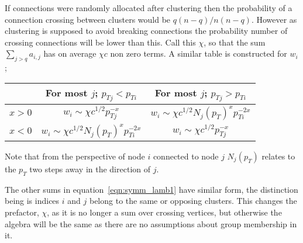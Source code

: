If connections were randomly allocated after clustering then the probability of a connection crossing between clusters would be \(q(n-q)/n(n-q)\).
However as clustering is supposed to avoid breaking connections the probability number of crossing connections will be lower than this.
Call this \(\chi\), so that the sum \(\sum_{j>q}a_{i,j}\) has on average \(\chi c\) non zero terms.
A similar table is constructed for \(w_{i}\);
\begin{center}
    \begin{tabular}{c | c c}
                & For most \(j\); \(p_{Tj} < p_{Ti}\) & For most \(j\); \(p_{Tj} > p_{Ti}\) \\
        \hline
        \(x>0\) & \(w_{i} \sim \chi c^{1/2}p_{Tj}^{-x}\) & \(w_{i} \sim \chi c^{1/2}N_j(p_T)^x p_{Ti}^{-2x}\)\\
        \(x<0\) & \(w_{i} \sim \chi c^{1/2}N_j(p_T)^x p_{Ti}^{-2x}\)& \(w_{i} \sim \chi c^{1/2}p_{Tj}^{-x}\)
    \end{tabular}
\end{center}

Note that from the perspective of node \(i\) connected to node \(j\)
\(N_j(p_T)\) relates to the \(p_T\) two steps away in the direction of \(j\).

The other sums in equation~\ref{eqn:symm_lamb1} have similar form,
the distinction being is indices \(i\) and \(j\) belong to the same or opposing clusters.
This changes the prefactor, \(\chi\), as it is no longer a sum over crossing vertices, 
but otherwise the algebra will be the same as there are no assumptions about group membership in it.

